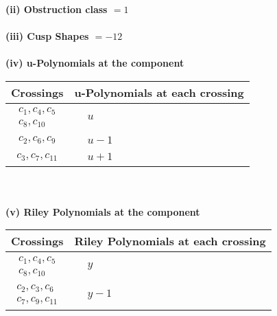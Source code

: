 \documentclass[1p]{elsarticle_modified}
\theoremstyle{definition}
\begin{document}
\flushleft \textbf{(ii) Obstruction class $= 1$}\\~\\
\flushleft \textbf{(iii) Cusp Shapes $= -12$}\\~\\
\newpage\renewcommand{\arraystretch}{1}
\flushleft \textbf{(iv) u-Polynomials at the component}\newline \\
\begin{tabular}{m{50pt}|m{274pt}}
Crossings & \hspace{64pt}u-Polynomials at each crossing \\
\hline $$\begin{aligned}c_{1},c_{4},c_{5}\\c_{8},c_{10}\end{aligned}$$&$\begin{aligned}
&u
\end{aligned}$\\
\hline $$\begin{aligned}c_{2},c_{6},c_{9}\end{aligned}$$&$\begin{aligned}
&u-1
\end{aligned}$\\
\hline $$\begin{aligned}c_{3},c_{7},c_{11}\end{aligned}$$&$\begin{aligned}
&u+1
\end{aligned}$\\
\hline
\end{tabular}\\~\\
\newpage\renewcommand{\arraystretch}{1}
\flushleft \textbf{(v) Riley Polynomials at the component}\newline \\
\begin{tabular}{m{50pt}|m{274pt}}
Crossings & \hspace{64pt}Riley Polynomials at each crossing \\
\hline $$\begin{aligned}c_{1},c_{4},c_{5}\\c_{8},c_{10}\end{aligned}$$&$\begin{aligned}
&y
\end{aligned}$\\
\hline $$\begin{aligned}c_{2},c_{3},c_{6}\\c_{7},c_{9},c_{11}\end{aligned}$$&$\begin{aligned}
&y-1
\end{aligned}$\\
\hline
\end{tabular}\\~\\
\end{document}

